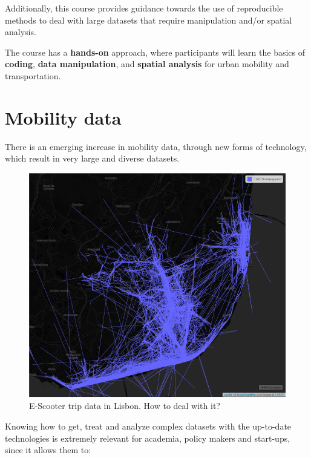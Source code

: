 \documentclass[
  letterpaper,
  DIV=11,
  numbers=noendperiod]{scrreprt}
\begin{document}
Additionally, this course provides guidance towards the use of
reproducible methods to deal with large datasets that require
manipulation and/or spatial analysis.

The course has a \textbf{hands-on} approach, where participants will
learn the basics of \textbf{coding}, \textbf{data manipulation}, and
\textbf{spatial analysis} for urban mobility and transportation.

\section{Mobility data}\label{mobility-data}

There is an emerging increase in mobility data, through new forms of
technology, which result in very large and diverse datasets.

\begin{figure}[H]

{\centering \includegraphics[width=6.25in,height=\textheight]{images/clipboard-2086563605.png}

}

\caption{E-Scooter trip data in Lisbon. How to deal with it?}

\end{figure}%

Knowing how to get, treat and analyze complex datasets with the
up-to-date technologies is extremely relevant for academia, policy
makers and start-ups, since it allows them to:
\end{document}
